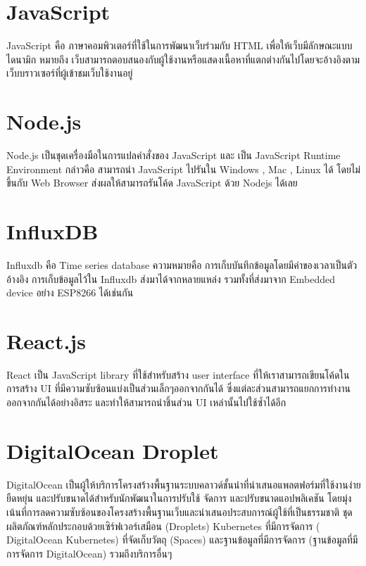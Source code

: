\section{JavaScript}
\cite[JavaScript]{javascript} JavaScript คือ ภาษาคอมพิวเตอร์ที่ใช้ในการพัฒนาเว็บร่วมกับ HTML เพื่อให้เว็บมีลักษณะแบบไดนามิก หมายถึง เว็บสามารถตอบสนองกับผู้ใช้งานหรือแสดงเนื้อหาที่แตกต่างกันไปโดยจะอ้างอิงตามเว็บบราวเซอร์ที่ผู้เข้าชมเว็บใช้งานอยู่

\section{Node.js}
\cite[Node.js]{nodejs} Node.js เป็นชุดเครื่องมือในการแปลคำสั่งของ JavaScript และ เป็น JavaScript Runtime Environment กล่าวคือ สามารถนำ JavaScript ไปรันใน Windows , Mac , Linux ได้ โดยไม่ขึ้นกับ Web Browser ส่งผลให้สามารถรันโค้ด JavaScript ด้วย Nodejs ได้เลย

\section{InfluxDB}
\cite[InfluxDB]{influxdb} Influxdb คือ Time series database ความหมายคือ การเก็บบันทึกข้อมูลโดยมีค่าของเวลาเป็นตัวอ้างอิง การเก็บข้อมูลไว้ใน Influxdb ส่งมาได้จากหลายแหล่ง รวมทั้งที่ส่งมาจาก Embedded device อย่าง ESP8266 ได้เช่นกัน

\section{React.js}
\cite[React.js]{react} React เป็น JavaScript library ที่ใช้สำหรับสร้าง user interface ที่ให้เราสามารถเขียนโค้ดในการสร้าง UI ที่มีความซับซ้อนแบ่งเป็นส่วนเล็กๆออกจากกันได้ ซึ่งแต่ละส่วนสามารถแยกการทำงานออกจากกันได้อย่างอิสระ และทำให้สามารถนำชิ้นส่วน UI เหล่านั้นไปใช้ซ้ำได้อีก

\section{DigitalOcean Droplet}
\cite[DigitalOcean]{digitalocean} DigitalOcean เป็นผู้ให้บริการโครงสร้างพื้นฐานระบบคลาวด์ชั้นนำที่นำเสนอแพลตฟอร์มที่ใช้งานง่าย ยืดหยุ่น และปรับขนาดได้สำหรับนักพัฒนาในการปรับใช้ จัดการ และปรับขนาดแอปพลิเคชัน โดยมุ่งเน้นที่การลดความซับซ้อนของโครงสร้างพื้นฐานเว็บและนำเสนอประสบการณ์ผู้ใช้ที่เป็นธรรมชาติ ชุดผลิตภัณฑ์หลักประกอบด้วยเซิร์ฟเวอร์เสมือน (Droplets) Kubernetes ที่มีการจัดการ ( DigitalOcean Kubernetes) ที่จัดเก็บวัตถุ (Spaces) และฐานข้อมูลที่มีการจัดการ (ฐานข้อมูลที่มีการจัดการ DigitalOcean) รวมถึงบริการอื่นๆ

